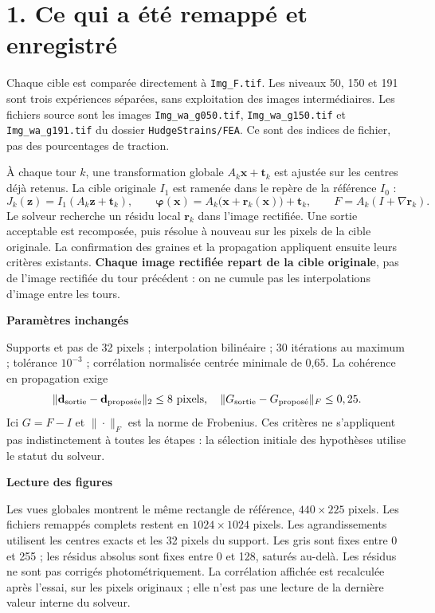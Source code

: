 \documentclass[11pt,a4paper,landscape]{article}
\begin{document}
\newpage
\section*{1. Ce qui a été remappé et enregistré}
Chaque cible est comparée directement à \texttt{Img\_F.tif}. Les niveaux 50, 150 et 191
sont trois expériences séparées, sans exploitation des images intermédiaires.
Les fichiers source sont les images \texttt{Img\_wa\_g050.tif},
\texttt{Img\_wa\_g150.tif} et \texttt{Img\_wa\_g191.tif} du dossier
\texttt{HudgeStrains/FEA}. Ce sont des indices de fichier, pas des pourcentages de traction.

À chaque tour $k$, une transformation globale $A_k\mathbf x+\mathbf t_k$ est ajustée
sur les centres déjà retenus. La cible originale $I_1$ est ramenée dans le repère de
la référence $I_0$ :
\[
 J_k(\mathbf z)=I_1(A_k\mathbf z+\mathbf t_k),\qquad
 \boldsymbol\varphi(\mathbf x)=A_k\bigl(\mathbf x+\mathbf r_k(\mathbf x)\bigr)+\mathbf t_k,
 \qquad F=A_k(I+\nabla\mathbf r_k).
\]
Le solveur recherche un résidu local $\mathbf r_k$ dans l'image rectifiée. Une sortie
acceptable est recomposée, puis résolue à nouveau sur les pixels de la cible originale.
La confirmation des graines et la propagation appliquent ensuite leurs critères existants.
\textbf{Chaque image rectifiée repart de la cible originale}, pas de l'image rectifiée
du tour précédent : on ne cumule pas les interpolations d'image entre les tours.

\begin{minipage}[t]{.48\linewidth}
\textbf{Paramètres inchangés}\par
Supports et pas de 32 pixels ; interpolation bilinéaire ; 30 itérations au maximum ;
tolérance $10^{-3}$ ; corrélation normalisée centrée minimale de 0,65.
La cohérence en propagation exige
\[
 \|\mathbf d_{\text{sortie}}-\mathbf d_{\text{proposée}}\|_2\leq8\ {\rm pixels},\quad
 \|G_{\text{sortie}}-G_{\text{proposé}}\|_F\leq0,25.
\]
Ici $G=F-I$ et $\|\cdot\|_F$ est la norme de Frobenius.
Ces critères ne s'appliquent pas indistinctement à toutes les étapes : la sélection
initiale des hypothèses utilise le statut du solveur.
\end{minipage}\hfill
\begin{minipage}[t]{.48\linewidth}
\textbf{Lecture des figures}\par
Les vues globales montrent le même rectangle de référence, $440\times225$ pixels.
Les fichiers remappés complets restent en $1024\times1024$ pixels.
Les agrandissements utilisent les centres exacts et les 32 pixels du support.
Les gris sont fixes entre 0 et 255 ; les résidus absolus sont fixes entre 0 et 128,
saturés au-delà. Les résidus ne sont pas corrigés photométriquement.
La corrélation affichée est recalculée après l'essai, sur les pixels originaux ;
elle n'est pas une lecture de la dernière valeur interne du solveur.
\end{minipage}
\end{document}
